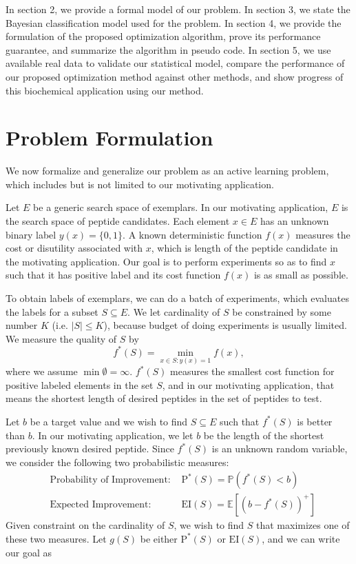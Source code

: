 \documentclass[opre,nonblindrev]{informs3} %
\newcommand{\E}{\mathbb{E}}
\newcommand{\EI}{\mathrm{EI}}
\newcommand{\PI}{\text{P}^*}
\begin{document}
In section 2, we provide a formal model of our problem.  In section 3, we state the Bayesian classification model used for the problem. In section 4, we provide the formulation of the proposed optimization algorithm, prove its performance guarantee, and summarize the algorithm in pseudo code. In section 5, we use available real data to validate our statistical model, compare the performance of our proposed optimization method against
other methods, and show progress of this biochemical application using our method.

\section{Problem Formulation} \label{sec:problem}

We now formalize and generalize our problem as an active learning problem, which includes but is not limited to our motivating application.

Let $E$ be a generic search space of exemplars.  In our motivating application, $E$ is the search space of peptide candidates. Each element $x \in E$ has an unknown binary label $y(x)=\{0,1\}$.  A known deterministic function $f(x)$ measures the cost or disutility associated with $x$, which is length of the peptide candidate in the motivating application. Our goal is to perform experiments so as to find $x$ such that it has positive label and its cost function $f(x)$ is as small as
possible.

To obtain labels of exemplars, we can do a batch of experiments, which evaluates the labels for a subset $S \subseteq E$. We let cardinality of $S$ be constrained by some number $K$ (i.e. $|S| \leq K$), because budget of doing experiments is usually limited. We measure the quality of $S$ by 
\begin{equation} \label{eq:fS}
f^*(S)= \underset{x \in S:y(x)=1}{\min} f(x),
\end{equation}
where we assume $\min \emptyset = \infty$. $f^*(S)$ measures the smallest cost function for positive labeled elements in the set $S$, and in our motivating application, that means the shortest length of desired peptides in the set of peptides to test.


Let $b$ be a target value and we wish to find $S\subseteq E$ such that $f^*(S)$ is better than $b$. In our motivating application, we let $b$ be the length of the shortest previously known desired peptide. Since $f^*(S)$ is an unknown random variable, we consider the following two probabilistic measures:
\begin{equation} \label{eq:twomeasure}
  \begin{aligned}
    &\text{Probability of Improvement: }&\PI(S) = \mathbb{P}(f^*(S) < b)\\
    &\text{Expected Improvement: }&\EI(S) = \E [(b-f^*(S))^+]
  \end{aligned}
\end{equation}
Given constraint on the cardinality of $S$, we wish to find $S$ that maximizes one of these two measures. Let $g(S)$ be either $\PI(S)$ or $\EI(S)$, and we can write our goal as
\end{document}
